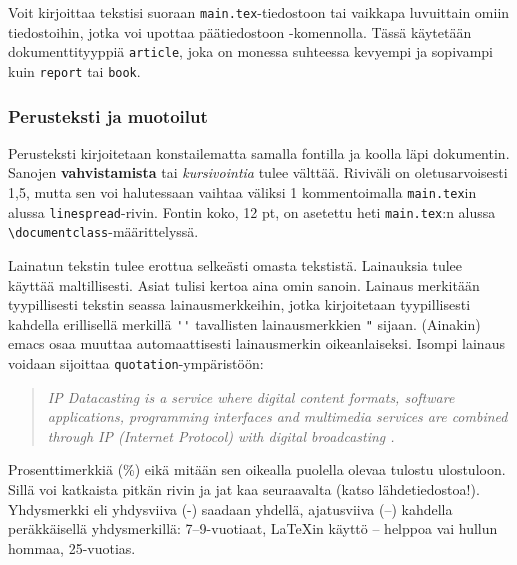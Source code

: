 Voit kirjoittaa tekstisi suoraan \verb!main.tex!-tiedostoon tai
vaikkapa luvuittain omiin tiedostoihin, jotka voi upottaa
päätiedostoon \verb!!-komennolla. Tässä käytetään
dokumenttityyppiä \verb!article!, joka on monessa suhteessa kevyempi
ja sopivampi kuin \verb!report! tai \verb!book!.


\subsubsection{Perusteksti ja muotoilut}

\begin{sloppypar}
Perusteksti kirjoitetaan konstailematta samalla fontilla ja koolla
läpi dokumentin. Sanojen \textbf{vahvistamista} tai
\textit{kursivointia} tulee välttää.  Riviväli on oletusarvoisesti
1,5, mutta sen voi halutessaan vaihtaa väliksi 1 kommentoimalla
\verb!main.tex!in alussa \verb!linespread!-rivin.  Fontin koko, 12 pt,
on asetettu heti \verb!main.tex!:n alussa
\verb!\documentclass!-määrittelyssä.
\end{sloppypar}


Lainatun tekstin tulee erottua selkeästi omasta tekstistä. Lainauksia
tulee käyttää maltillisesti. Asiat tulisi kertoa aina omin
sanoin. Lainaus merkitään tyypillisesti tekstin seassa
lainausmerkkeihin, jotka kirjoitetaan tyypillisesti kahdella
erillisellä merkillä \verb!''! tavallisten lainausmerkkien \verb!"!
sijaan. (Ainakin) emacs osaa muuttaa automaattisesti lainausmerkin
oikeanlaiseksi. Isompi lainaus voidaan sijoittaa
\verb!quotation!-ympäristöön:

\begin{quotation} { 
\noindent \it
IP Datacasting is a service where digital content formats, software
applications, programming interfaces and multimedia services are
combined through IP (Internet Protocol) with digital
broadcasting \citep{RefWorks:doc:601937178f0884cb02a8458c}. } 
\end{quotation}

Prosenttimerkkiä (\%) eikä mitään sen oikealla puolella olevaa tulostu
ulostuloon. Sillä voi katkaista pitkän rivin ja jat%
kaa seuraavalta (katso lähdetiedostoa!).  Yhdysmerkki eli yhdysviiva
(-) saadaan yhdellä, ajatusviiva (--) kahdella peräkkäisellä
yhdysmerkillä: 7--9-vuotiaat, LaTeXin käyttö -- helppoa vai hullun
hommaa, 25-vuotias.

